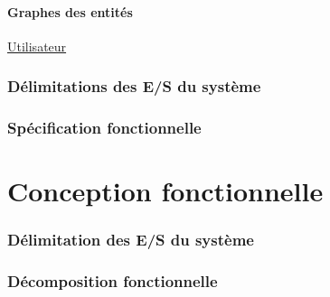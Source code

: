 \documentclass[11pt, french]{article} %
\begin{document}
\subsection{Graphes des entités}
\begin{figure}%
\centering
{}
\end{figure}

\hspace{0.2in}
\underline{Utilisateur}   
%

\section{Délimitations des E/S du système}

\section{Spécification fonctionnelle}

\part{Conception fonctionnelle}
\section{Délimitation des E/S du système}
\section{Décomposition fonctionnelle}

%
\end{document}
